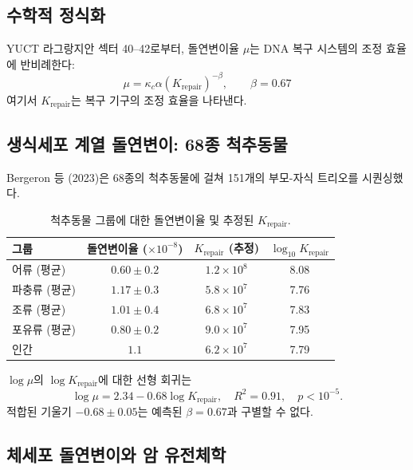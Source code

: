 \documentclass[11pt,a4paper]{article}
\begin{document}
	\subsection{수학적 정식화}
	
	YUCT 라그랑지안 섹터 40--42로부터, 돌연변이율 \(\mu\)는 DNA 복구 시스템의 조정 효율에 반비례한다:
	\begin{equation}
		\mu = \kappa_c \alpha \left(K_{\text{repair}}\right)^{-\beta}, \qquad \beta = 0.67
		\label{eq:mutation-rate}
	\end{equation}
	여기서 \(K_{\text{repair}}\)는 복구 기구의 조정 효율을 나타낸다.
	
	\subsection{생식세포 계열 돌연변이: 68종 척추동물}
	
	Bergeron 등 (2023)은 68종의 척추동물에 걸쳐 151개의 부모-자식 트리오를 시퀀싱했다.
	
	\begin{table}[H]
		\centering
		\caption{척추동물 그룹에 대한 돌연변이율 및 추정된 \(K_{\text{repair}}\).}
		\label{tab:vertebrate-mutations}
		\begin{tabular}{lccc}
			\toprule
			\textbf{그룹} & \textbf{돌연변이율 (\(\times 10^{-8}\))} & \textbf{\(K_{\text{repair}}\) (추정)} & \(\log_{10} K_{\text{repair}}\) \\
			\midrule
			어류 (평균) & \(0.60 \pm 0.2\) & \(1.2 \times 10^8\) & 8.08 \\
			파충류 (평균) & \(1.17 \pm 0.3\) & \(5.8 \times 10^7\) & 7.76 \\
			조류 (평균) & \(1.01 \pm 0.4\) & \(6.8 \times 10^7\) & 7.83 \\
			포유류 (평균) & \(0.80 \pm 0.2\) & \(9.0 \times 10^7\) & 7.95 \\
			인간 & \(1.1\) & \(6.2 \times 10^7\) & 7.79 \\
			\bottomrule
		\end{tabular}
	\end{table}
	
	\(\log \mu\)의 \(\log K_{\text{repair}}\)에 대한 선형 회귀는
	\begin{equation}
		\log \mu = 2.34 - 0.68 \log K_{\text{repair}}, \quad R^2 = 0.91, \quad p < 10^{-5}.
		\label{eq:mutation-fit}
	\end{equation}
	적합된 기울기 \(-0.68 \pm 0.05\)는 예측된 \(\beta = 0.67\)과 구별할 수 없다.
	
	\subsection{체세포 돌연변이와 암 유전체학}
	
\end{document}
